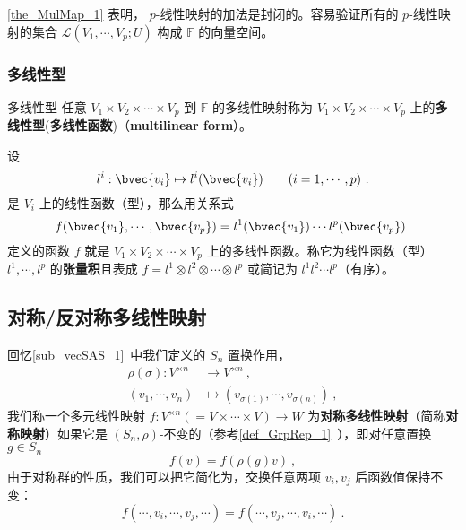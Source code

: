 \autoref{the_MulMap_1} 表明， $p$-线性映射的加法是封闭的。容易验证所有的 $p$-线性映射的集合 $\mathcal{L}(V_1,\cdots,V_p;U)$ 构成 $\mathbb{F}$ 的向量空间。

\subsubsection{多线性型}

\begin{definition}{多线性型}\label{def_MulMap_2}
任意 $V_1\times V_2\times\cdots\times V_p$ 到 $\mathbb{F}$ 的多线性映射称为 $V_1\times V_2\times\cdots\times V_p$ 上的\textbf{多线性型}(\textbf{多线性函数})（\textbf{multilinear form}）。
\end{definition}
\begin{example}{}
设
\begin{equation}
l^i:\bvec{v_i}\mapsto l^i(\bvec{v_i})\qquad (i=1,\cdots,p)~.
\end{equation}
是 $V_i$ 上的线性函数（型），那么用关系式
\begin{equation}
f(\bvec{v_1},\cdots,\bvec{v_p})=l^1(\bvec{v_1})\cdots l^p(\bvec{v_p})~
\end{equation}
定义的函数 $f$ 就是 $V_1\times V_2\times\cdots\times V_p$ 上的多线性函数。称它为线性函数（型）$l^1,\cdots,l^p$ 的\textbf{张量积}且表成 $f=l^1\otimes l^2\otimes\cdots\otimes l^p$ 或简记为 $l^1l^2\cdots l^p$（有序）。
\end{example}

\subsection{对称/反对称多线性映射}


回忆\autoref{sub_vecSAS_1}~中我们定义的 $S_n$ 置换作用，
\begin{equation}
\begin{aligned}
\rho(\sigma): V^{\times n} &\to V^{\times n}~, \\
(v_1, \cdots, v_n) &\mapsto (v_{\sigma(1)}, \cdots, v_{\sigma(n)})~,
\end{aligned}
\end{equation}
我们称一个多元线性映射 $f: V^{\times n} (= V \times \cdots \times V) \to W$ 为\textbf{对称多线性映射}（简称\textbf{对称映射}）如果它是 $(S_n, \rho)$-不变的（参考\autoref{def_GrpRep_1}~），即对任意置换 $g \in S_n$
\begin{equation}
f(v) = f(\rho(g) v)~,
\end{equation}
由于对称群的性质，我们可以把它简化为，交换任意两项 $v_i, v_j$ 后函数值保持不变：
\begin{equation}
f(\cdots, v_i, \cdots, v_j, \cdots) = f(\cdots, v_j, \cdots, v_i, \cdots)~.
\end{equation}

